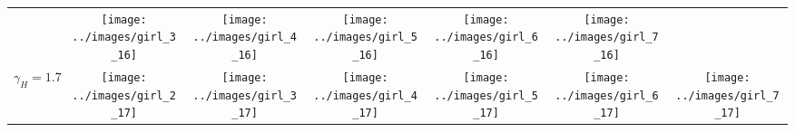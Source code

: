 \begin{tabular}{ T S @{} S @{} S @{} S @{} S @{} S }
  & \texttt{[image: ../images/girl\_3\_16]}
  & \texttt{[image: ../images/girl\_4\_16]}
  & \texttt{[image: ../images/girl\_5\_16]}
  & \texttt{[image: ../images/girl\_6\_16]}
  & \texttt{[image: ../images/girl\_7\_16]} \\ [-4pt]
  $\gamma_H=1.7$
  & \texttt{[image: ../images/girl\_2\_17]}
  & \texttt{[image: ../images/girl\_3\_17]}
  & \texttt{[image: ../images/girl\_4\_17]}
  & \texttt{[image: ../images/girl\_5\_17]}
  & \texttt{[image: ../images/girl\_6\_17]}
  & \texttt{[image: ../images/girl\_7\_17]} \\ [-4pt]

  
\end{tabular}
\vfill
